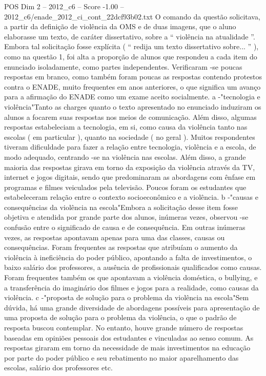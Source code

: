 \begin{textsample}{POS Dim 2 – 2012\_c6 – Score -1.00 – 2012\_c6/enade\_2012\_ci\_cont\_22dcf93b02.txt}
O comando da questão solicitava, a partir da definição de violência da OMS e de duas imagens, que o aluno elaborasse um texto, de caráter dissertativo, sobre a “ violência na atualidade ”.
Embora tal solicitação fosse explícita ( “ redija um texto dissertativo sobre... ” ), como na questão 1, foi alta a proporção de alunos que respondeu a cada item do enunciado isoladamente, como partes independentes.
Verificaram -se poucas respostas em branco, como também foram poucas as respostas contendo protestos contra o ENADE, muito frequentes em anos anteriores, o que significa um avanço para a afirmação do ENADE como um exame aceito socialmente. a -"tecnologia e violência"Tanto as charges quanto o texto apresentado no enunciado induziram os alunos a focarem suas respostas nos meios de comunicação.
Além disso, algumas respostas estabeleciam a tecnologia, em si, como causa da violência tanto nas escolas ( em particular ), quanto na sociedade ( no geral ).
Muitos respondentes tiveram dificuldade para fazer a relação entre tecnologia, violência e a escola, de modo adequado, centrando -se na violência nas escolas.
Além disso, a grande maioria das respostas girava em torno da exposição da violência através da TV, internet e jogos digitais, sendo que predominaram as abordagens com ênfase em programas e filmes veiculados pela televisão.
Poucos foram os estudantes que estabeleceram relação entre o contexto socioeconômico e a violência. b -"causas e consequências da violência na escola"Embora a solicitação desse item fosse objetiva e atendida por grande parte dos alunos, inúmeras vezes, observou -se confusão entre o significado de causa e de consequência.
Em outras inúmeras vezes, as respostas apontavam apenas para uma das classes, causas ou consequências.
Foram frequentes as respostas que atribuíam o aumento da violência à ineficiência do poder público, apontando a falta de investimentos, o baixo salário dos professores, a ausência de profissionais qualificados como causas.
Foram frequentes também os que apontavam a violência doméstica, o bullying, e a transferência do imaginário dos filmes e jogos para a realidade, como causas da violência. c -"proposta de solução para o problema da violência na escola"Sem dúvida, há uma grande diversidade de abordagens possíveis para apresentação de uma proposta de solução para o problema da violência, o que o padrão de resposta buscou contemplar.
No entanto, houve grande número de respostas baseadas em opiniões pessoais dos estudantes e vinculadas ao senso comum.
As respostas giraram em torno da necessidade de mais investimentos na educação por parte do poder público e seu rebatimento no maior aparelhamento das escolas, salário dos professores etc.

\end{textsample}
